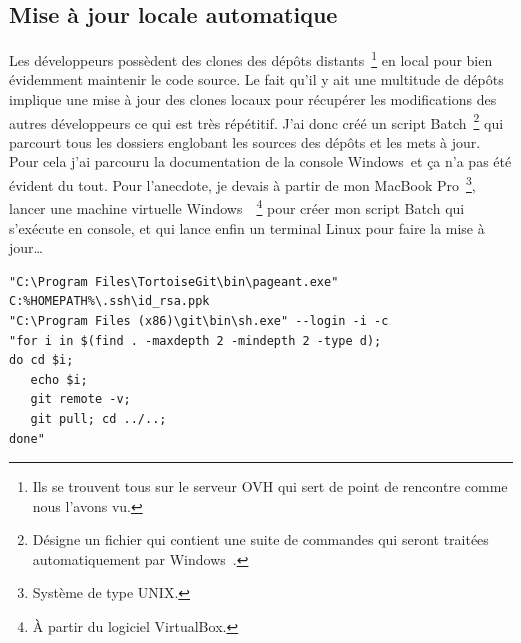 \subsection{Mise à jour locale automatique} %
\label{sub:Mise à jour locale automatique}

Les développeurs possèdent des clones des dépôts distants\,
\footnote{Ils se trouvent tous sur le serveur OVH qui sert de point de
rencontre comme nous l'avons vu.} en local pour bien évidemment
maintenir le code source. Le fait qu'il y ait une multitude de dépôts
implique une mise à jour des clones locaux pour récupérer les
modifications des autres développeurs ce qui est très répétitif. J'ai
donc créé un script Batch\, \footnote{Désigne un fichier qui contient
une suite de commandes qui seront traitées automatiquement par
Windows~\textregistered.} qui parcourt tous les dossiers englobant les
sources des dépôts et les mets à jour. Pour cela j'ai parcouru la
documentation de la console Windows~\textregistered et ça n'a pas été
évident du tout. Pour l'anecdote, je devais à partir de mon MacBook
Pro\, \footnote{Système de type UNIX.}, lancer une machine virtuelle
Windows~\textregistered\, \footnote{À partir du logiciel VirtualBox.}
pour créer mon script Batch qui s'exécute en console, et qui lance enfin
un terminal Linux pour faire la mise à jour\dots\\

\begin{lstlisting}[basicstyle=\ttfamily\small, frame=trBL]
"C:\Program Files\TortoiseGit\bin\pageant.exe"
C:%HOMEPATH%\.ssh\id_rsa.ppk
"C:\Program Files (x86)\git\bin\sh.exe" --login -i -c
"for i in $(find . -maxdepth 2 -mindepth 2 -type d);
do cd $i;
   echo $i;
   git remote -v;
   git pull; cd ../..;
done"
\end{lstlisting}
